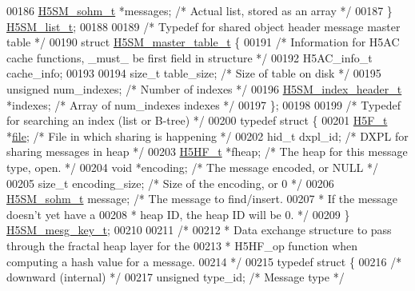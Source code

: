\begin{DoxyCode}
00186     \hyperlink{struct_h5_s_m__sohm__t}{H5SM\_sohm\_t} *messages;          \textcolor{comment}{/* Actual list, stored as an array */}
00187 \} \hyperlink{struct_h5_s_m__list__t}{H5SM\_list\_t};
00188 
00189 \textcolor{comment}{/* Typedef for shared object header message master table */}
00190 \textcolor{keyword}{struct }\hyperlink{struct_h5_s_m__master__table__t}{H5SM\_master\_table\_t} \{
00191     \textcolor{comment}{/* Information for H5AC cache functions, \_must\_ be first field in structure */}
00192     H5AC\_info\_t cache\_info;
00193 
00194     \textcolor{keywordtype}{size\_t} table\_size;              \textcolor{comment}{/* Size of table on disk */}
00195     \textcolor{keywordtype}{unsigned} num\_indexes;           \textcolor{comment}{/* Number of indexes */}
00196     \hyperlink{struct_h5_s_m__index__header__t}{H5SM\_index\_header\_t} *indexes;   \textcolor{comment}{/* Array of num\_indexes indexes */}
00197 \};
00198 
00199 \textcolor{comment}{/* Typedef for searching an index (list or B-tree) */}
00200 \textcolor{keyword}{typedef} \textcolor{keyword}{struct }\{
00201     \hyperlink{struct_h5_f__t}{H5F\_t} *\hyperlink{structfile}{file};                        \textcolor{comment}{/* File in which sharing is happening */}
00202     hid\_t dxpl\_id;                      \textcolor{comment}{/* DXPL for sharing messages in heap */}
00203     \hyperlink{struct_h5_h_f__t}{H5HF\_t} *fheap;                \textcolor{comment}{/* The heap for this message type, open. */}
00204     \textcolor{keywordtype}{void} *encoding;                 \textcolor{comment}{/* The message encoded, or NULL */}
00205     \textcolor{keywordtype}{size\_t} encoding\_size;       \textcolor{comment}{/* Size of the encoding, or 0 */}
00206     \hyperlink{struct_h5_s_m__sohm__t}{H5SM\_sohm\_t} message;                \textcolor{comment}{/* The message to find/insert.}
00207 \textcolor{comment}{                                         * If the message doesn't yet have a}
00208 \textcolor{comment}{                                         * heap ID, the heap ID will be 0. */}
00209 \} \hyperlink{struct_h5_s_m__mesg__key__t}{H5SM\_mesg\_key\_t};
00210 
00211 \textcolor{comment}{/*}
00212 \textcolor{comment}{ * Data exchange structure to pass through the fractal heap layer for the}
00213 \textcolor{comment}{ * H5HF\_op function when computing a hash value for a message.}
00214 \textcolor{comment}{ */}
00215 \textcolor{keyword}{typedef} \textcolor{keyword}{struct }\{
00216     \textcolor{comment}{/* downward (internal) */}
00217     \textcolor{keywordtype}{unsigned}    type\_id;                \textcolor{comment}{/* Message type */}

\end{DoxyCode}

